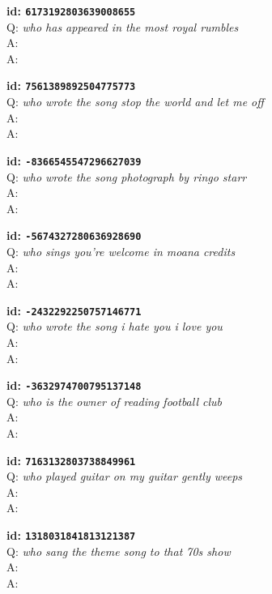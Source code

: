 \tiny{\setlength{\parindent}{0cm}
\textbf{id: \texttt{6173192803639008655}} \\
Q: \textit{who has appeared in the most royal rumbles} \\
A:  \\
A: }

\tiny{\setlength{\parindent}{0cm}
\textbf{id: \texttt{7561389892504775773}} \\
Q: \textit{who wrote the song stop the world and let me off} \\
A:  \\
A: }

\tiny{\setlength{\parindent}{0cm}
\textbf{id: \texttt{-8366545547296627039}} \\
Q: \textit{who wrote the song photograph by ringo starr} \\
A:  \\
A: }

\tiny{\setlength{\parindent}{0cm}
\textbf{id: \texttt{-5674327280636928690}} \\
Q: \textit{who sings you're welcome in moana credits} \\
A:  \\
A: }

\tiny{\setlength{\parindent}{0cm}
\textbf{id: \texttt{-2432292250757146771}} \\
Q: \textit{who wrote the song i hate you i love you} \\
A:  \\
A: }

\tiny{\setlength{\parindent}{0cm}
\textbf{id: \texttt{-3632974700795137148}} \\
Q: \textit{who is the owner of reading football club} \\
A:  \\
A: }

\tiny{\setlength{\parindent}{0cm}
\textbf{id: \texttt{7163132803738849961}} \\
Q: \textit{who played guitar on my guitar gently weeps} \\
A:  \\
A: }

\tiny{\setlength{\parindent}{0cm}
\textbf{id: \texttt{1318031841813121387}} \\
Q: \textit{who sang the theme song to that 70s show} \\
A:  \\
A: }

